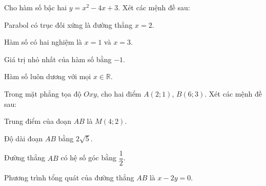 
\NQuestion Cho hàm số bậc hai $y=x^2-4x+3$. Xét các mệnh đề sau:

\begin{SubQuestions}
\item Parabol có trục đối xứng là đường thẳng $x=2$.
\item Hàm số có hai nghiệm là $x=1$ và $x=3$.
\item Giá trị nhỏ nhất của hàm số bằng $-1$.
\item Hàm số luôn dương với mọi $x\in\mathbb{R}$.
\end{SubQuestions}

\NQuestion Trong mặt phẳng tọa độ $Oxy$, cho hai điểm $A(2;1)$, $B(6;3)$. Xét các mệnh đề sau:

\begin{SubQuestions}
\item Trung điểm của đoạn $AB$ là $M(4;2)$.
\item Độ dài đoạn $AB$ bằng $2\sqrt{5}$.
\item Đường thẳng $AB$ có hệ số góc bằng $\dfrac{1}{2}$.
\item Phương trình tổng quát của đường thẳng $AB$ là $x-2y=0$.
\end{SubQuestions}
